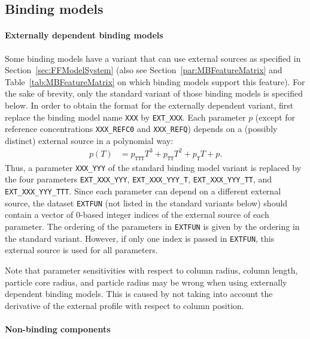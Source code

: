 \subsection{Binding models}\label{sec:FFAdsorption}

\paragraph{Externally dependent binding models}

Some binding models have a variant that can use external sources as specified in Section~\ref{sec:FFModelSystem} (also see Section~\ref{par:MBFeatureMatrix} and Table~\ref{tab:MBFeatureMatrix} on which binding models support this feature).
For the sake of brevity, only the standard variant of those binding models is specified below.
In order to obtain the format for the externally dependent variant, first replace the binding model name \texttt{XXX} by \texttt{EXT\_XXX}.
Each parameter $p$ (except for reference concentrations \texttt{XXX\_REFC0} and \texttt{XXX\_REFQ}) depends on a (possibly distinct) external source in a polynomial way:
\begin{align*}
  p(T) &= p_{\texttt{TTT}} T^3 + p_{\texttt{TT}} T^2 + p_{\texttt{T}} T + p.
\end{align*}
Thus, a parameter \texttt{XXX\_YYY} of the standard binding model variant is replaced by the four parameters \texttt{EXT\_XXX\_YYY}, \texttt{EXT\_XXX\_YYY\_T}, \texttt{EXT\_XXX\_YYY\_TT}, and \texttt{EXT\_XXX\_YYY\_TTT}.
Since each parameter can depend on a different external source, the dataset \texttt{EXTFUN} (not listed in the standard variants below) should contain a vector of 0-based integer indices of the external source of each parameter.
The ordering of the parameters in \texttt{EXTFUN} is given by the ordering in the standard variant.
However, if only one index is passed in \texttt{EXTFUN}, this external source is used for all parameters.

Note that parameter sensitivities with respect to column radius, column length, particle core radius, and particle radius may be wrong when using externally dependent binding models.
This is caused by not taking into account the derivative of the external profile with respect to column position.

\paragraph{Non-binding components}


